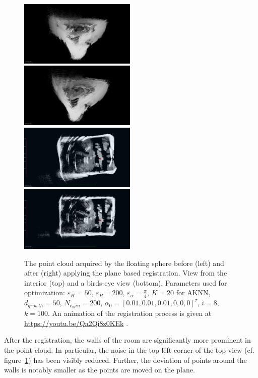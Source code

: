 \documentclass[5p]{elsarticle}
\renewcommand{\epsilon}{\varepsilon}
\begin{document}
\begin{figure}
	\centering
	\includegraphics[width=0.495\textwidth]{./images/cylon_uncorr_corner}\hfill
	\includegraphics[width=0.495\textwidth]{./images/cylon_corr_corner}\\
	\includegraphics[width=0.495\textwidth]{./images/cylon_uncorr_top}\hfill
	\includegraphics[width=0.495\textwidth]{./images/cylon_corr_top}
	\caption{The point cloud acquired by the floating sphere before (left) and after (right) applying the plane based registration. View from the interior (top) and a birds-eye view (bottom). Parameters used for optimization: $\epsilon_H = 50$, $\epsilon_P = 200$, $\epsilon_\alpha = \frac{\pi}{4}$, $K = 20$ for AKNN, $d_{growth} = 50$, $N_{c_min} = 200$, $\alpha_0 = [0.01, 0.01, 0.01, 0, 0, 0]^\tau$, $i = 8$, $k = 100$. An animation of the registration process is given at \url{https://youtu.be/Qa2Qi8z0KEk} .}
	\label{fig:cylon-corrected}
\end{figure}
After the registration, the walls of the room are significantly more prominent in the point cloud. 
In particular, the noise in the top left corner of the top view (cf. figure~\ref{fig:cylon-corrected}) has been visibly reduced.
Further, the deviation of points around the walls is notably smaller as the points are moved on the plane.
\end{document}
